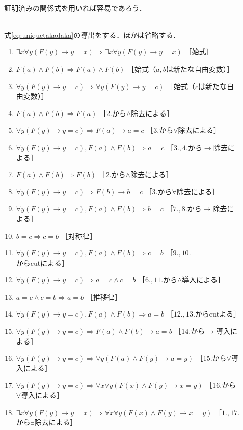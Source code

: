 \begin{description}
\item[] \mbox{} \\
  証明済みの関係式を用いれば容易であろう．
\item[] \mbox{} \\
  式\eqref{eq:uniquetakadaka}の導出をする．ほかは省略する．
  \begin{enumerate}[1. ]
    \item $\exists x \forall y (F(y) \to y=x)
           \Longrightarrow \exists x \forall y (F(y) \to y=x)$ \quad ［始式］
    \item $F(a) \land F(b) \Longrightarrow F(a) \land F(b) $ 
           \quad ［始式（$a,  b$は新たな自由変数）］
    \item $\forall y (F(y) \to y=c) \Longrightarrow \forall y (F(y) \to y=c)$
           \quad ［始式（$c$は新たな自由変数）］
    \item $F(a) \land F(b) \Longrightarrow F(a)$ \quad ［2.から$\land$除去による］
    \item $\forall y (F(y ) \to y=c ) \Longrightarrow F(a) \to a =c $
           \quad ［3.から$\forall$除去による］
    \item $\forall y (F(y) \to y=c) ,  F(a) \land F(b) \Longrightarrow a =c$
           \quad ［$3., 4.$から$\to$除去による］
    \item $F(a) \land F(b) \Longrightarrow F(b)$ \quad ［2.から$\land$除去による］
    \item $\forall y (F(y) \to y=c) \Longrightarrow F(b) \to b=c$
           \quad ［3.から$\forall$除去による］
    \item $\forall y (F(y) \to y =c) ,  F(a) \land F(b) \Longrightarrow b =c$
           \quad ［$7., 8.$から$\to$除去による］
    \item $b=c \Longrightarrow c =b$ \quad ［対称律］
    \item $\forall y (F(y) \to y =c) ,  F(a) \land F(b) 
           \Longrightarrow c =b$ \quad ［$9., 10.$からcutによる］
    \item $\forall y (F(y) \to y=c) \Longrightarrow a =c \land c=b$ 
           \quad ［$6., 11.$から$\land$導入による］
    \item $a=c \land c=b \Longrightarrow a=b$ \quad ［推移律］
    \item $\forall y (F(y) \to y=c) ,  F(a) \land F(b) 
           \Longrightarrow a =b$ \quad ［$12., 13.$からcutよる］
    \item $\forall y (F(y) \to y =c) \Longrightarrow 
           F(a) \land F(b) \to a =b$ \quad ［14.から$\to$導入による］
    \item $\forall y (F(y) \to y=c) \Longrightarrow 
           \forall y (F(a) \land F(y) \to a =y)$ \quad ［15.から$\forall$導入による］
    \item $\forall y(F(y) \to y=c) \Longrightarrow 
           \forall x \forall y (F(x) \land F(y) \to x=y)$ \quad ［16.から$\forall$導入による］
    \item $\exists x \forall y (F(y) \to y=x) \Longrightarrow 
           \forall x \forall y (F(x) \land F(y) \to x=y )$
           \quad ［$1., 17.$から$\exists$除去による］
  \end{enumerate}
\end{description}
